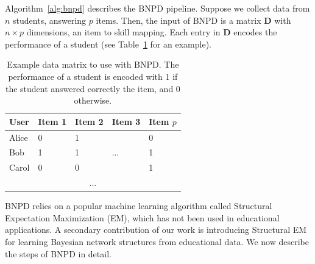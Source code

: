 \documentclass{edm_template}
\newcommand{\hl}[1]{\colorbox{yellow}{#1}}
\begin{document}
Algorithm~\ref{alg:bnpd} describes the BNPD pipeline.
Suppose we collect data from  $n$ students, answering $p$ items.
Then, the input of BNPD is a matrix $\mathbf{D}$ with $n \times p$ dimensions, an item to skill mapping.%
Each entry in $\mathbf{D}$ encodes the performance of a student (see Table~\ref{tbl:d-matrix} for an example).


\begin{table}[htb]%
	\centering
	\caption{Example data matrix to use with BNPD.  The performance of a student is encoded with 1 if the student answered correctly the item, and 0 otherwise. \label{tbl:d-matrix}}
	\begin{tabular}{@{}lllll@{}}
		\toprule
		User  & Item 1 & Item 2 & Item 3 & Item $p$ \\ \midrule
		Alice & 0      & 1      &        & 0        \\
		Bob   & 1      & 1      & ...    & 1        \\
		Carol & 0      & 0      &        & 1        \\
		\multicolumn{5}{c}{...}                     \\ \bottomrule
	\end{tabular}
\end{table}


BNPD relies on a popular machine learning algorithm called Structural Expectation Maximization (EM), which has not been used in educational applications. 
A secondary contribution of our work is introducing Structural EM for learning Bayesian network structures from educational data.
We now describe the  steps of BNPD in detail.
\end{document}
